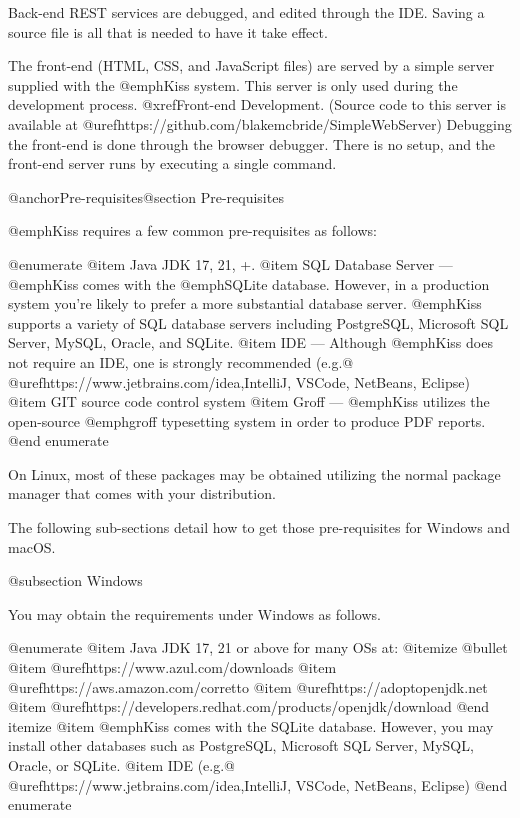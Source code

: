 Back-end REST services are debugged, and edited through the IDE.
Saving a source file is all that is needed to have it take effect.

The front-end (HTML, CSS, and JavaScript files) are served by a simple
server supplied with the @emph{Kiss} system.  This server is only used
during the development process.  @xref{Front-end Development}.
(Source code to this server is available at
@uref{https://github.com/blakemcbride/SimpleWebServer}) Debugging the
front-end is done through the browser debugger.  There is no setup,
and the front-end server runs by executing a single command.

@anchor{Pre-requisites}@section Pre-requisites

@emph{Kiss} requires a few common pre-requisites as follows:


@enumerate
@item
Java JDK 17, 21, +. 
@item
SQL Database Server --- @emph{Kiss} comes with the @emph{SQLite} database.  However, in a production
system you're likely to prefer a more substantial database server.  @emph{Kiss} supports a variety of SQL database servers including 
PostgreSQL, Microsoft SQL Server, MySQL, Oracle, and SQLite.
@item
IDE --- Although @emph{Kiss} does not require an IDE, one is strongly recommended (e.g.@ @uref{https://www.jetbrains.com/idea,IntelliJ}, VSCode, NetBeans, Eclipse)
@item
GIT source code control system
@item
Groff --- @emph{Kiss} utilizes the open-source @emph{groff} typesetting system in order to produce PDF reports.
@end enumerate

On Linux, most of these packages may be obtained utilizing the normal
package manager that comes with your distribution.

The following sub-sections detail how to get those pre-requisites for Windows and macOS.

@subsection Windows


You may obtain the requirements under Windows as follows.

@enumerate
@item
Java JDK 17, 21 or above for many OSs at:
@itemize @bullet
@item
@uref{https://www.azul.com/downloads}
@item
@uref{https://aws.amazon.com/corretto}
@item
@uref{https://adoptopenjdk.net}
@item
@uref{https://developers.redhat.com/products/openjdk/download}
@end itemize
@item
@emph{Kiss} comes with the SQLite database.  However, you may install other databases such as PostgreSQL, Microsoft SQL Server, MySQL,
Oracle, or SQLite.
@item
IDE (e.g.@ @uref{https://www.jetbrains.com/idea,IntelliJ}, VSCode, NetBeans, Eclipse)
@end enumerate

